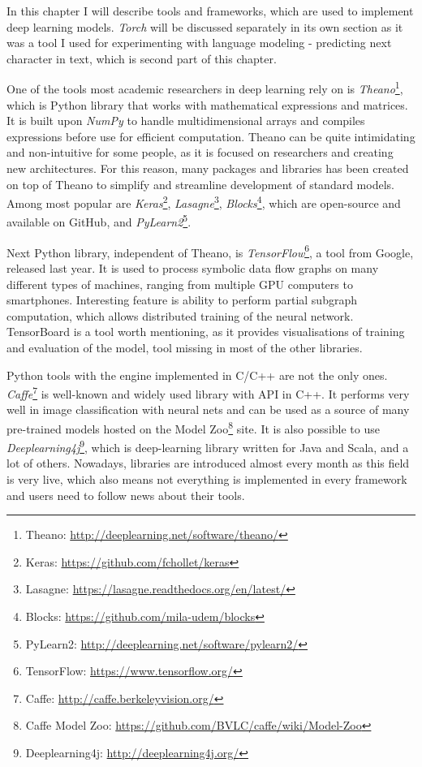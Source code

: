 In this chapter I will describe tools and frameworks, which are used to implement deep learning models. \emph{Torch} will be discussed separately in its own section as it was a tool I used for experimenting with language modeling - predicting next character in text, which is second part of this chapter.


One of the tools most academic researchers in deep learning rely on is \emph{Theano}\footnote{Theano: \url{http://deeplearning.net/software/theano/}}\cite{bergstra-proc-scipy-2010}, which is Python library that works with mathematical expressions and matrices. It is built upon \emph{NumPy} to handle multidimensional arrays and compiles expressions before use for efficient computation. Theano can be quite intimidating and non-intuitive for some people, as it is focused on researchers and creating new architectures. For this reason, many packages and libraries has been created on top of Theano to simplify and streamline development of standard models. Among most popular are \emph{Keras}\footnote{Keras: \url{https://github.com/fchollet/keras}}, \emph{Lasagne}\footnote{Lasagne: \url{https://lasagne.readthedocs.org/en/latest/}}, \emph{Blocks}\footnote{Blocks: \url{https://github.com/mila-udem/blocks}}, which are open-source and available on GitHub, and \emph{PyLearn2}\footnote{PyLearn2: \url{http://deeplearning.net/software/pylearn2/}}.

Next Python library, independent of Theano, is \emph{TensorFlow}\footnote{TensorFlow: \url{https://www.tensorflow.org/}}, a tool from Google, released last year. It is used to process symbolic data flow graphs on many different types of machines, ranging from multiple GPU computers to smartphones. Interesting feature is ability to perform partial subgraph computation, which allows distributed training of the neural network. TensorBoard is a tool worth mentioning, as it provides visualisations of training and evaluation of the model, tool missing in most of the other libraries.

Python tools with the engine implemented in C/C++ are not the only ones. \emph{Caffe}\footnote{Caffe: \url{http://caffe.berkeleyvision.org/}} is well-known and widely used library with API in C++. It performs very well in image classification with neural nets and can be used as a source of many pre-trained models hosted on the Model Zoo\footnote{Caffe Model Zoo: \url{https://github.com/BVLC/caffe/wiki/Model-Zoo}} site. It is also possible to use \emph{Deeplearning4j}\footnote{Deeplearning4j: \url{http://deeplearning4j.org/}}, which is deep-learning library written for Java and Scala, and a lot of others. Nowadays, libraries are introduced almost every month as this field is very live, which also means not everything is implemented in every framework and users need to follow news about their tools.

